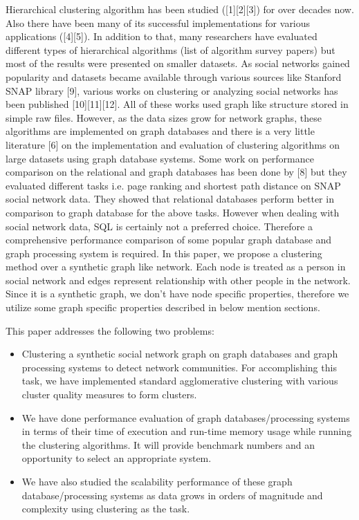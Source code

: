 \documentclass[11pt,onecolumn]{article}
\begin{document}
Hierarchical clustering algorithm has been studied ([1][2][3]) for over decades now. Also there have been many of its successful implementations for various applications ([4][5]). In addition to that, many researchers have evaluated different types of hierarchical algorithms (list of algorithm survey papers) but most of the results were presented on smaller datasets. 
As social networks gained popularity and datasets became available through various sources like Stanford SNAP library [9], various works on clustering or analyzing social networks has been published [10][11][12]. All of these works used graph like structure stored in simple raw files. However, as the data sizes grow for network graphs, these algorithms are implemented on graph databases and there is a very little literature [6] on the implementation and evaluation of clustering algorithms on large datasets using graph database systems. 
Some work on performance comparison on the relational and graph databases has been done by [8] but they evaluated different tasks i.e. page ranking and shortest path distance on SNAP social network data. They showed that relational databases perform better in comparison to graph database for the above tasks. However when dealing with social network data, SQL is certainly not a preferred choice. Therefore a comprehensive performance comparison of some popular graph database and graph processing system is required.
In this paper, we propose a clustering method over a synthetic graph like network. Each node is treated as a person in social network and edges represent relationship with other people in the network. Since it is a synthetic graph, we don’t have node specific properties, therefore we utilize some graph specific properties described in below mention sections.

This paper addresses the following two problems:
\begin{itemize}
\item
Clustering a synthetic social network graph on graph databases and graph processing systems to detect network communities. For accomplishing this task, we have implemented standard agglomerative clustering with various cluster quality measures to form clusters.
\item
We have done performance evaluation of graph databases/processing systems in terms of their time of execution and run-time memory usage while running the clustering algorithms. It will provide benchmark numbers and an opportunity to select an appropriate system.
\item
We have also studied the scalability performance of these graph database/processing systems as data grows in orders of magnitude and complexity using clustering as the task.
\end{itemize}
\end{document}
